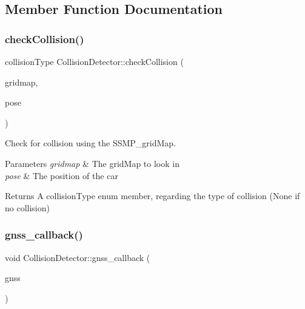 \subsection{Member Function Documentation}
\mbox{\label{classCollisionDetector_a9dd68a8a3fc937d28cb236d720456802}} 
\subsubsection{\texorpdfstring{check\+Collision()}{checkCollision()}}
{\footnotesize\ttfamily collision\+Type Collision\+Detector\+::check\+Collision (\begin{DoxyParamCaption}\item[{const grid\+\_\+map\+::\+Grid\+Map \&}]{gridmap,  }\item[{const geometry\+\_\+msgs\+::\+Pose \&}]{pose }\end{DoxyParamCaption})\hspace{0.3cm}{\ttfamily [inline]}}



Check for collision using the S\+S\+M\+P\+\_\+grid\+Map. 


\begin{DoxyParams}{Parameters}
{\em gridmap} & The grid\+Map to look in \\
\hline
{\em pose} & The position of the car \\
\hline
\end{DoxyParams}
\begin{DoxyReturn}{Returns}
A collision\+Type enum member, regarding the type of collision (None if no collision) 
\end{DoxyReturn}
\mbox{\label{classCollisionDetector_a58422375b62b0eee48dbd73d7943bad9}} 
\subsubsection{\texorpdfstring{gnss\+\_\+callback()}{gnss\_callback()}}
{\footnotesize\ttfamily void Collision\+Detector\+::gnss\+\_\+callback (\begin{DoxyParamCaption}\item[{const geometry\+\_\+msgs\+::\+Pose\+Stamped\+::\+Const\+Ptr \&}]{gnss }\end{DoxyParamCaption})\hspace{0.3cm}{\ttfamily [inline]}}



